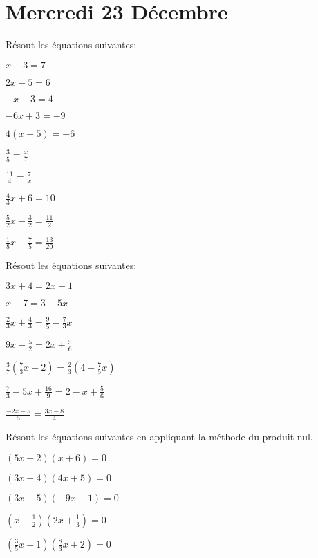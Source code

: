 \section{Mercredi 23 Décembre}

\begin{exercicefr}
    Résout les équations suivantes:
    \begin{exerciceenumnoeq}
        \item $x+3=7$
        \item $2x-5=6$
        \item $-x-3=4$
        \item $-6x+3=-9$
        \item $4(x-5) = -6$
        \item $\frac35 = \frac{x}7$
        \item $\frac{11}4 = \frac7x$
        \item $\frac43x + 6 = 10$
        \item $\frac52x - \frac32 = \frac{11}2$
        \item $\frac18x - \frac75 = \frac{13}{20}$
    \end{exerciceenumnoeq}
\end{exercicefr}

\begin{exercicefr}
    Résout les équations suivantes:
    \begin{exerciceenumnoeq}
        \item $3x+4 = 2x-1$
        \item $x+7 = 3-5x$
        \item $\frac23x + \frac43 = \frac95 - \frac73x$
        \item $9x - \frac52 = 2x+\frac56$
        \item $\frac37\left(\frac73x + 2\right) = \frac23\left(4 - \frac75x\right)$
        \item $\frac73 - 5x + \frac{16}9 = 2 - x + \frac56$
        \item $\frac{-2x-5}5 = \frac{3x-8}4$
    \end{exerciceenumnoeq}
\end{exercicefr}

\begin{exercicefr}
    Résout les équations suivantes en appliquant la méthode du produit nul.
    \begin{exerciceenumnoeq}
        \item $(5x-2)(x+6) = 0$
        \item $(3x+4)(4x+5) = 0$
        \item $(3x-5)(-9x+1) = 0$
        \item $\left(x-\frac12\right)\left(2x+\frac13\right)=0$
        \item $\left(\frac35x-1\right)\left(\frac83x+2\right) = 0$
    \end{exerciceenumnoeq}
\end{exercicefr}


